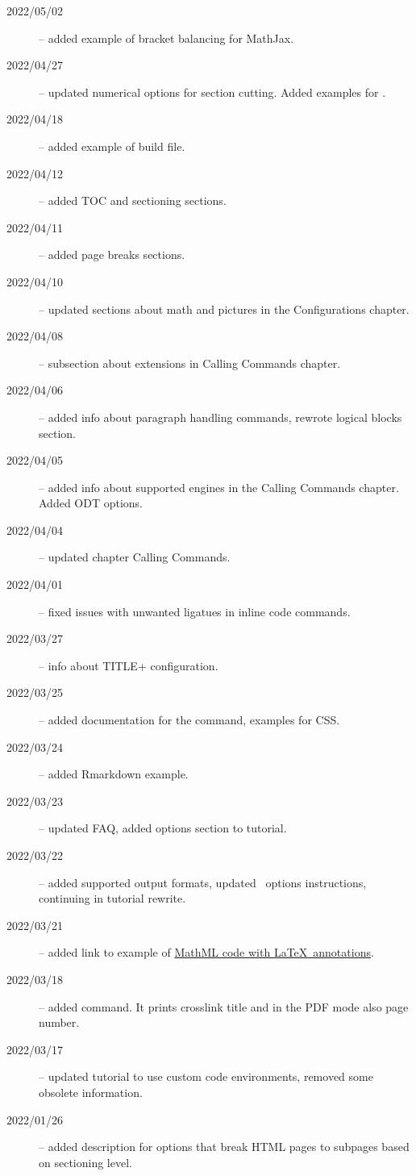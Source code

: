 
\begin{description}
  \item[2022/05/02] -- added example of bracket balancing for MathJax.
  \item[2022/04/27] -- updated numerical options for section cutting. Added examples for .
  \item[2022/04/18] -- added example of \makefourht{} build file.
  \item[2022/04/12] -- added TOC and sectioning sections.
  \item[2022/04/11] -- added page breaks sections.
  \item[2022/04/10] -- updated sections about math and pictures in the Configurations chapter.
  \item[2022/04/08] -- subsection about \makefourht{} extensions in Calling Commands chapter.
  \item[2022/04/06] -- added info about paragraph handling commands, rewrote logical blocks section.
  \item[2022/04/05] -- added info about supported engines in the Calling Commands chapter. Added ODT options.
  \item[2022/04/04] -- updated chapter Calling Commands.
  \item[2022/04/01] -- fixed issues with unwanted ligatues in inline code commands.
  \item[2022/03/27] -- info about TITLE+ configuration.
  \item[2022/03/25] -- added documentation for the  command, examples for CSS.
  \item[2022/03/24] -- added Rmarkdown example.
  \item[2022/03/23] -- updated FAQ, added options section to tutorial.
  \item[2022/03/22] -- added supported output formats, updated \fourhtsty\ options instructions, continuing in tutorial rewrite.
  \item[2022/03/21] -- added link to example of \href{https://tex.stackexchange.com/a/637910/2891}{MathML code with \LaTeX\ annotations}.
  \item[2022/03/18] -- added \texcommand{\namerefpage} command. It prints crosslink title and in the PDF mode also page number.
  \item[2022/03/17] -- updated tutorial to use custom code environments, removed some obsolete information.
  \item[2022/01/26] -- added description for options that break HTML pages to subpages based on sectioning level.

\end{description}
